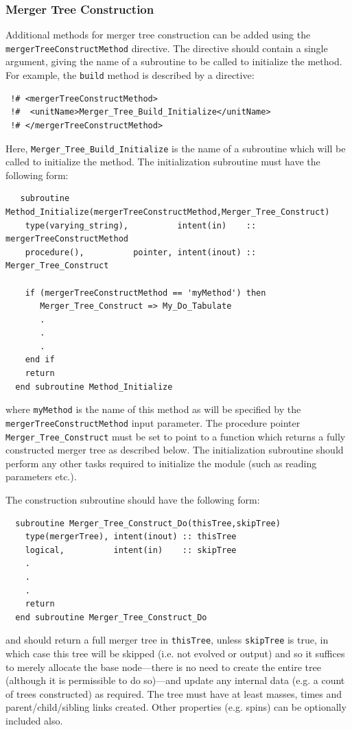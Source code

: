 \subsubsection{Merger Tree Construction}\label{sec:MergerTreeConstruction}

Additional methods for merger tree construction can be added using the {\tt mergerTreeConstructMethod} directive. The directive should contain a single argument, giving the name of a subroutine to be called to initialize the method. For example, the {\tt build} method is described by a directive:
\begin{verbatim}
 !# <mergerTreeConstructMethod>
 !#  <unitName>Merger_Tree_Build_Initialize</unitName>
 !# </mergerTreeConstructMethod>
\end{verbatim}
Here, {\tt Merger\_Tree\_Build\_Initialize} is the name of a subroutine which will be called to initialize the method. The initialization subroutine must have the following form:
\begin{verbatim}
   subroutine Method_Initialize(mergerTreeConstructMethod,Merger_Tree_Construct)
    type(varying_string),          intent(in)    :: mergerTreeConstructMethod
    procedure(),          pointer, intent(inout) :: Merger_Tree_Construct
    
    if (mergerTreeConstructMethod == 'myMethod') then
       Merger_Tree_Construct => My_Do_Tabulate
       .
       .
       .
    end if
    return
  end subroutine Method_Initialize
\end{verbatim}
where {\tt myMethod} is the name of this method as will be specified by the {\tt mergerTreeConstructMethod} input parameter. The procedure pointer {\tt Merger\_Tree\_Construct} must be set to point to a function which returns a fully constructed merger tree as described below. The initialization subroutine should perform any other tasks required to initialize the module (such as reading parameters etc.).

The construction subroutine should have the following form:
\begin{verbatim}
  subroutine Merger_Tree_Construct_Do(thisTree,skipTree)
    type(mergerTree), intent(inout) :: thisTree
    logical,          intent(in)    :: skipTree
    .
    .
    .
    return
  end subroutine Merger_Tree_Construct_Do
\end{verbatim}
and should return a full merger tree in {\tt thisTree}, unless {\tt skipTree} is true, in which case this tree will be skipped (i.e. not evolved or output) and so it suffices to merely allocate the base node---there is no need to create the entire tree (although it is permissible to do so)---and update any internal data (e.g. a count of trees constructed) as required. The tree must have at least masses, times and parent/child/sibling links created. Other properties (e.g. spins) can be optionally included also.

